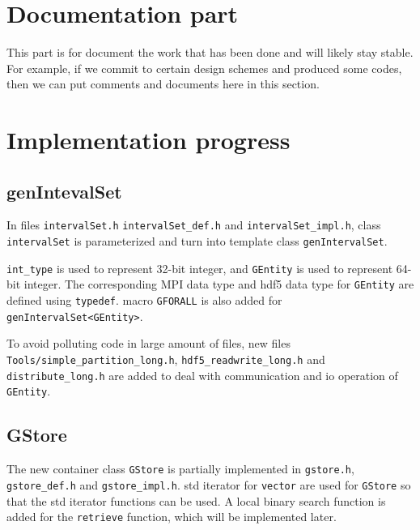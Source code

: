 \documentclass{article}
\begin{document}
% 
\section{Documentation part}
This part is for document the work that has been done and will likely
stay stable.  For example, if we commit to certain design schemes and
produced some codes, then we can put comments and documents here in this
section.

\section{Implementation progress}
\subsection{genIntevalSet}
In files \texttt{intervalSet.h} \texttt{intervalSet\_def.h} and \texttt{intervalSet\_impl.h},
class \texttt{intervalSet} is parameterized and turn into template class
\texttt{genIntervalSet}. 

\texttt{int\_type} is used to represent 32-bit integer, and \texttt{GEntity} is used to
represent 64-bit integer. The corresponding MPI data type and hdf5
data type for \texttt{GEntity} are defined using \texttt{typedef}. macro \texttt{GFORALL}
is also added for \texttt{genIntervalSet<GEntity>}.

To avoid
polluting code in large amount of files, new files
\texttt{Tools/simple\_partition\_long.h}, \texttt{hdf5\_readwrite\_long.h} and
\texttt{distribute\_long.h} are added to deal with communication and io operation of
\texttt{GEntity}.

  
\subsection{GStore}
The new container class \texttt{GStore} is partially implemented in \texttt{gstore.h},
\texttt{gstore\_def.h} and \texttt{gstore\_impl.h}. 
std iterator for \texttt{vector} are used for \texttt{GStore} so that the std iterator functions
can be used. A local binary search function is added for the \texttt{retrieve}
function, which will be implemented later.
\end{document}
